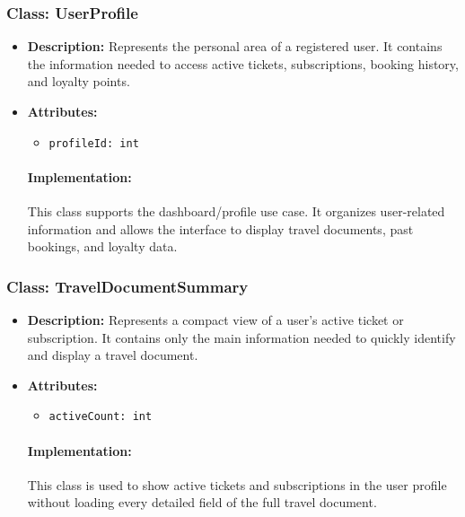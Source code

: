 \documentclass{article}
\begin{document}
\subsubsection*{Class: UserProfile}
\begin{itemize}
    \item \textbf{Description:} Represents the personal area of a registered user. It contains the information needed to access active tickets, subscriptions, booking history, and loyalty points.
    \item \textbf{Attributes:}
    \begin{itemize}
        \item \texttt{profileId: int}
    \end{itemize}
\paragraph{Implementation:} This class supports the dashboard/profile use case. It organizes user-related information and allows the interface to display travel documents, past bookings, and loyalty data.
\end{itemize}

\subsubsection*{Class: TravelDocumentSummary}
\begin{itemize}
    \item \textbf{Description:} Represents a compact view of a user’s active ticket or subscription. It contains only the main information needed to quickly identify and display a travel document.
    \item \textbf{Attributes:}
    \begin{itemize}
        \item \texttt{activeCount: int}
    \end{itemize}
\paragraph{Implementation:} This class is used to show active tickets and subscriptions in the user profile without loading every detailed field of the full travel document.
\end{itemize}
\end{document}
